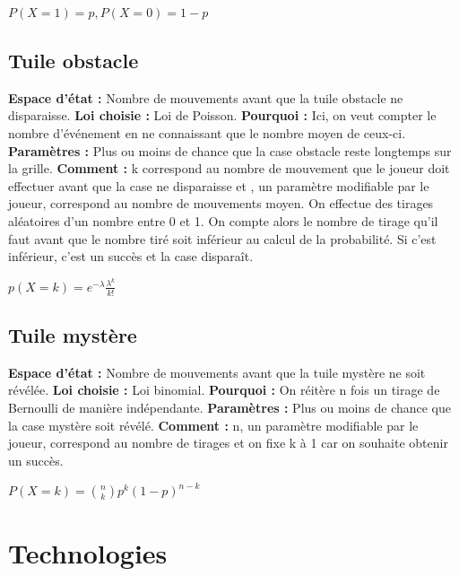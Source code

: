\documentclass[a4paper, 12pt]{report}
\begin{document}
\begin{flushleft}
\begin{center}
${P(X = 1) = p, P(X = 0) = 1-p}$
\end{center}


\section{Tuile obstacle}

\textbf{Espace d'état :} Nombre de mouvements avant que la tuile obstacle ne disparaisse.\break
\textbf{Loi choisie :} Loi de Poisson.\break
\textbf{Pourquoi :} Ici, on veut compter le nombre d'événement en ne connaissant que le nombre moyen de ceux-ci.\break
\textbf{Paramètres :} Plus ou moins de chance que la case obstacle reste longtemps sur la grille.\break
\textbf{Comment :} k correspond au nombre de mouvement que le joueur doit effectuer avant que la case ne disparaisse et , un paramètre modifiable par le joueur, correspond au nombre de mouvements moyen. 
On effectue des tirages aléatoires d’un nombre entre 0 et 1.  On compte alors le nombre de tirage qu’il faut avant que le nombre tiré soit inférieur au calcul de la probabilité. Si c’est inférieur, c’est un succès et la case disparaît.\break

\begin{center}
${p(X=k)=e^{-\lambda}\frac{\lambda^k}{k!}}$
\end{center}

\section{Tuile mystère}

\textbf{Espace d'état :} Nombre de mouvements avant que la tuile mystère ne soit révélée.\break
\textbf{Loi choisie :} Loi binomial.\break
\textbf{Pourquoi :} On réitère n fois un tirage de Bernoulli de manière indépendante.\break
\textbf{Paramètres :} Plus ou moins de chance que la case mystère soit révélé.\break
\textbf{Comment :} n, un paramètre modifiable par le joueur,  correspond au nombre de tirages et on fixe k à 1 car on souhaite obtenir un succès.\break

\begin{center}
${P(X=k)={n \choose k} p^k(1-p)^{n-k}}$
\end{center}

\end{flushleft}

\chapter{Technologies}
\end{document}
